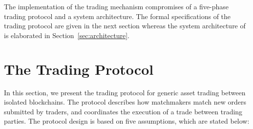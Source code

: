 The implementation of the \ModelName{} trading mechanism compromises of a five-phase trading protocol and a system architecture.
The formal specifications of the trading protocol are given in the next section whereas the system architecture of \ModelName{} is elaborated in Section~\ref{sec:architecture}.

\section{The \ModelName{} Trading Protocol} \label{sec:protocol}
In this section, we present the \ModelName{} trading protocol for generic asset trading between isolated blockchains.
The protocol describes how matchmakers match new orders submitted by traders, and coordinates the execution of a trade between trading parties.
The protocol design is based on five assumptions, which are stated below:

